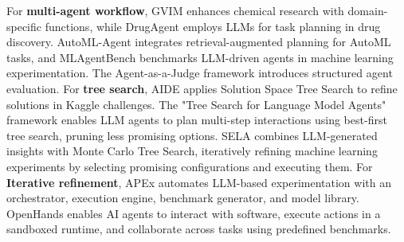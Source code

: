     For \textbf{multi-agent workflow}, GVIM \cite{ma2025gvim} enhances chemical research with domain-specific functions, while DrugAgent \cite{liu2024drugagent} employs LLMs for task planning in drug discovery. AutoML-Agent \cite{trirat2024automl} integrates retrieval-augmented planning for AutoML tasks, and MLAgentBench \cite{huang2024mlagentbench} benchmarks LLM-driven agents in machine learning experimentation. The Agent-as-a-Judge framework \cite{zhuge2024agent} introduces structured agent evaluation. %
    For \textbf{tree search}, AIDE \cite{schmidt2024introducing} applies Solution Space Tree Search to refine solutions in Kaggle challenges. The "Tree Search for Language Model Agents" framework \cite{koh2024tree} enables LLM agents to plan multi-step interactions using best-first tree search, pruning less promising options. SELA \cite{chi2024sela} combines LLM-generated insights with Monte Carlo Tree Search, iteratively refining machine learning experiments by selecting promising configurations and executing them.
    For \textbf{Iterative refinement}, APEx \cite{conti2024benchmarking} automates LLM-based experimentation with an orchestrator, execution engine, benchmark generator, and model library. OpenHands \cite{wang2024openhands} enables AI agents to interact with software, execute actions in a sandboxed runtime, and collaborate across tasks using predefined benchmarks.


